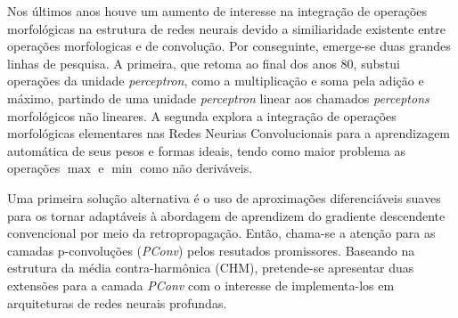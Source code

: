 Nos últimos anos houve um aumento de interesse na integração de operações morfológicas na estrutura de redes neurais devido a similiaridade existente entre operações morfologicas e de convolução.
Por conseguinte, emerge-se duas grandes linhas de pesquisa.
A primeira, que retoma ao final dos anos 80, substui operações da unidade \emph{perceptron}, como a multiplicação e soma pela adição e máximo, partindo de uma unidade \emph{perceptron} linear aos chamados \emph{perceptons} morfológicos não lineares.
A segunda explora a integração de operações morfológicas elementares nas Redes Neurias Convolucionais para a aprendizagem automática de seus pesos e formas ideais, tendo como maior problema as operações $\max$ e $\min$ como não deriváveis.

Uma primeira solução alternativa é o uso de aproximações diferenciáveis suaves para os tornar adaptáveis à abordagem de aprendizem do gradiente descendente convencional por meio da retropropagação.
Então, chama-se a atenção para as camadas p-convoluções (\emph{PConv}) pelos resutados promissores.
Baseando na estrutura da média contra-harmônica (CHM), pretende-se apresentar duas extensões para a camada \emph{PConv} com o interesse de implementa-los em arquiteturas de redes neurais profundas.